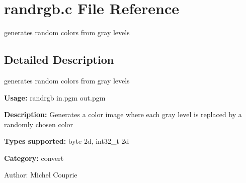 \section{randrgb.c File Reference}
\label{randrgb_8c}
generates random colors from gray levels 



\subsection{Detailed Description}
generates random colors from gray levels 

{\bf Usage:} randrgb in.pgm out.pgm

{\bf Description:} Generates a color image where each gray level is replaced by a randomly chosen color

{\bf Types supported:} byte 2d, int32\_\-t 2d

{\bf Category:} convert

\begin{Desc}
\item[Author:]Michel Couprie \end{Desc}
